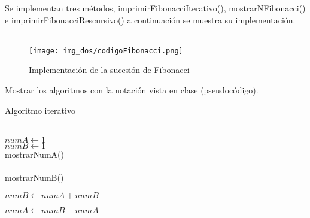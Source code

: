 \documentclass[12pt,twoside]{article}
\begin{document}
Se implementan tres métodos, imprimirFibonacciIterativo(), mostrarNFibonacci() e imprimirFibonacciRescursivo() a continuación se muestra su implementación.\\\\
\vspace{5 mm}
\begin{figure}[H]
\centering
\vspace{10 mm}
\texttt{[image: img\_dos/codigoFibonacci.png]}
\caption{Implementación de la sucesión de Fibonacci}
\end{figure}
Mostrar los algoritmos con la notación vista en clase (pseudocódigo).\\
\begin{algorithm}[H]
    \caption{Algoritmo iterativo}
      \label{euclides}
      \begin{algorithmic}[1]
      
          \\
              \State $numA\gets 1$
              \\
              \State $numB\gets 1$
              \\
                    \State mostrarNumA()
                    \\
                    \\
                    \State mostrarNumB()
                    
              \State $numB\gets numA + numB$
              
              \State $numA\gets numB - numA$       
              \\
          \EndFor    
          \\
          \EndProcedure
      \end{algorithmic}
  \end{algorithm}
\vspace{1 mm}
\end{document}
